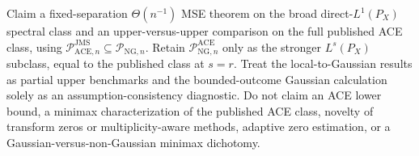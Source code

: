 Claim a fixed-separation \(\Theta(n^{-1})\) MSE theorem on the broad direct-\(L^1(P_X)\) spectral class and an upper-versus-upper comparison on the full published ACE class, using \(\mathcal P_{\mathrm{ACE},n}^{\mathrm{JMS}}\subseteq\mathcal P_{\mathrm{NG},n}\). Retain \(\mathcal P_{\mathrm{NG},n}^{\mathrm{ACE}}\) only as the stronger \(L^s(P_X)\) subclass, equal to the published class at \(s=r\). Treat the local-to-Gaussian results as partial upper benchmarks and the bounded-outcome Gaussian calculation solely as an assumption-consistency diagnostic. Do not claim an ACE lower bound, a minimax characterization of the published ACE class, novelty of transform zeros or multiplicity-aware methods, adaptive zero estimation, or a Gaussian-versus-non-Gaussian minimax dichotomy.